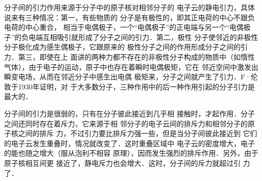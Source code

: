 分子间的引力作用来源于分子中的原子核对相邻分子的
电子云的静电引力，具体说来有三种情况：第一，有些物质的
分子是有极性的，即其正电荷的中心不跟负电荷的中心重合，
相当于电偶极子，一个“电偶极子”的正电端与另一个“电偶极
子”的负电端互相吸引就形成了分子之间的引力．第二，极性
分子使邻近的非极性分子极化成为感生偶极子，它跟原来的
极性分子之间的作用形成分子之间的引力．第三，即使在上
面讲的两种力都不存在的非极性分子构成的物质中（如惰性
气体），由于电子的运动，原子中也存在着瞬时电偶极矩，它在
邻近空间中激发出瞬变电场，从而在邻近分子中感生出电偶
极矩来，分子之间就产生了引力．F·伦敦于1930年证明，对
于大多数分子，三种作用中的后一种作用引起的分子引力是
最大的．

分子间的引力是很弱的，只有在分子彼此接近到几乎相
接触时，才起作用．分子之间还同时存在着斥力，它来源于相
邻分子的电子云间的排斥力和相邻分子的原子核之间的排斥
力，不过引力要比排斥力强一些，但是当分子间彼此接近到
它们的电子云发生重叠时，情况就改变了．这时重叠区域中
电子云的密度增大，电子的能也随之增大（服从泡利不相容
原理），因而发生强烈的排斥作用．另外，由于原子核相互间更
接近了，静电斥力也会增大．这时，分子间的斥力就超过引
力了．































